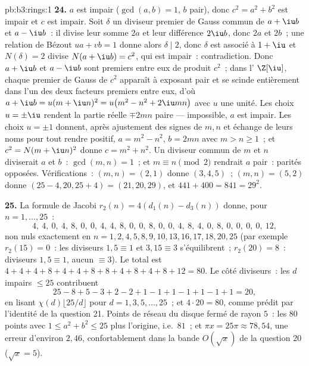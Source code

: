 \begin{solution}{pb:b3:rings:1}
\textbf{24.} $a$ est impair ($\gcd(a, b) = 1$, $b$ pair), donc
$c^2 = a^2 + b^2$ est impair et $c$ est impair. Soit $\delta$
un diviseur premier de Gauss commun de $a + \iu b$ et $a - \iu
b$~: il divise leur somme $2a$ et leur différence $2\iu b$, donc
$2a$ et $2b$~; une relation de Bézout $ua + vb = 1$ donne alors
$\delta \mid 2$, donc $\delta$ est associé à $1 + \iu$ et
$N(\delta) = 2$ divise $N(a + \iu b) = c^2$, qui est impair~:
contradiction. Donc $a + \iu b$ et $a - \iu b$ sont premiers
entre eux de produit $c^2$~; dans l' $\Z[\iu]$, chaque
premier de Gauss de $c^2$ apparaît à exposant pair et se scinde
entièrement dans l'un des deux facteurs premiers entre eux,
d'où $a + \iu b = u(m + \iu n)^2 = u\bigl(m^2 - n^2 + 2\iu
mn\bigr)$ avec $u$ une unité. Les choix $u = \pm\iu$ rendent la
partie réelle $\mp 2mn$ paire --- impossible, $a$ est impair.
Les choix $u = \pm1$ donnent, après ajustement des signes de
$m, n$ et échange de leurs noms pour tout rendre positif, $a =
m^2 - n^2$, $b = 2mn$ avec $m > n \geq 1$~; et $c^2 = N(m + \iu
n)^2$ donne $c = m^2 + n^2$. Un diviseur commun de $m$ et $n$
diviserait $a$ et $b$~: $\gcd(m, n) = 1$~; et $m \equiv n \pmod
2$ rendrait $a$ pair~: parités opposées. Vérifications~: $(m,
n) = (2, 1)$ donne $(3, 4, 5)$~; $(m, n) = (5, 2)$ donne $(25 -
4, 20, 25 + 4) = (21, 20, 29)$, et $441 + 400 = 841 = 29^2$.

\textbf{25.} La formule de Jacobi $r_2(n) = 4(d_1(n) - d_3(n))$
donne, pour $n = 1, \dots, 25$~:
\[
4,\ 4,\ 0,\ 4,\ 8,\ 0,\ 0,\ 4,\ 4,\ 8,\ 0,\ 0,\ 8,\ 0,\ 0,\
4,\ 8,\ 4,\ 0,\ 8,\ 0,\ 0,\ 0,\ 0,\ 12,
\]
non nuls exactement en $n = 1, 2, 4, 5, 8, 9, 10, 13, 16, 17,
18, 20, 25$ (par exemple $r_2(15) = 0$~: les diviseurs $1, 5
\equiv 1$ et $3, 15 \equiv 3$ s'équilibrent~; $r_2(20) = 8$~:
diviseurs $1, 5 \equiv 1$, aucun $\equiv 3$). Le total est $4 +
4 + 4 + 8 + 4 + 4 + 8 + 8 + 4 + 8 + 4 + 8 + 12 = 80$. Le côté
diviseurs~: les $d$ impairs $\leq 25$ contribuent
\[
25 - 8 + 5 - 3 + 2 - 2 + 1 - 1 + 1 - 1 + 1 - 1 + 1 = 20,
\]
en lisant $\chi(d)\lfloor 25/d\rfloor$ pour $d = 1, 3, 5,
\dots, 25$~; et $4 \cdot 20 = 80$, comme prédit par l'identité
de la question 21. Points de réseau du disque fermé de rayon
$5$~: les $80$ points avec $1 \leq a^2 + b^2 \leq 25$ plus
l'origine, i.e.\ $81$~; et $\pi x = 25\pi \approx 78{,}54$, une
erreur d'environ $2{,}46$, confortablement dans la bande
$O(\sqrt x)$ de la question 20 ($\sqrt x = 5$).
\end{solution}
